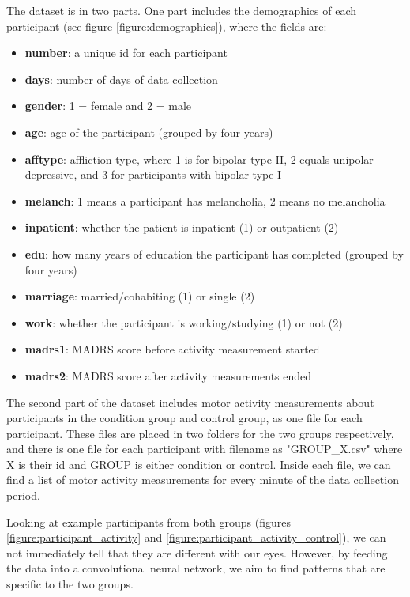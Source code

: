 The dataset is in two parts. One part includes the demographics of each participant (see figure \ref{figure:demographics}), where the fields are:

\begin{itemize}
    \item \textbf{number}: a unique id for each participant
    \item \textbf{days}: number of days of data collection 
    \item \textbf{gender}: 1 = female and 2 = male
    \item \textbf{age}: age of the participant (grouped by four years)
    \item \textbf{afftype}: affliction type, where 1 is for bipolar type II, 2 equals unipolar depressive, and 3 for participants with bipolar type I
    \item \textbf{melanch}: 1 means a participant has melancholia, 2 means no melancholia
    \item \textbf{inpatient}: whether the patient is inpatient (1) or outpatient (2)
    \item \textbf{edu}: how many years of education the participant has completed (grouped by four years)
    \item \textbf{marriage}: married/cohabiting (1) or single (2)
    \item \textbf{work}: whether the participant is working/studying (1) or not (2)
    \item \textbf{madrs1}: MADRS score before activity measurement started
    \item \textbf{madrs2}: MADRS score after activity measurements ended
\end{itemize}



The second part of the dataset includes motor activity measurements about participants in the condition group and control group, as one file for each participant. These files are placed in two folders for the two groups respectively, and there is one file for each participant with filename as "GROUP\_X.csv" where X is their id and GROUP is either condition or control. Inside each file, we can find a list of motor activity measurements for every minute of the data collection period.

Looking at example participants from both groups (figures \ref{figure:participant_activity} and \ref{figure:participant_activity_control}), we can not immediately tell that they are different with our eyes. However, by feeding the data into a convolutional neural network, we aim to find patterns that are specific to the two groups. 

